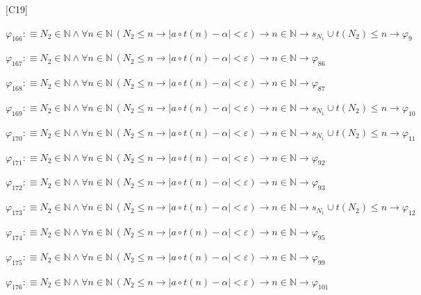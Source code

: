 \begin{fullproof}{[C19]}
\begin{abbrevlist}
\item $\varphi_{166} :\equiv N_{2} \in \mathbb{N} \land \forall n \in \mathbb{N}\,(N_{2} \leq n \to \lvert a \circ t(n) - \alpha \rvert < \varepsilon) \to n \in \mathbb{N} \to s_{N_{1}} \cup t(N_{2}) \leq n \to \varphi_{9}$
\item $\varphi_{167} :\equiv N_{2} \in \mathbb{N} \land \forall n \in \mathbb{N}\,(N_{2} \leq n \to \lvert a \circ t(n) - \alpha \rvert < \varepsilon) \to n \in \mathbb{N} \to \varphi_{86}$
\item $\varphi_{168} :\equiv N_{2} \in \mathbb{N} \land \forall n \in \mathbb{N}\,(N_{2} \leq n \to \lvert a \circ t(n) - \alpha \rvert < \varepsilon) \to n \in \mathbb{N} \to \varphi_{87}$
\item $\varphi_{169} :\equiv N_{2} \in \mathbb{N} \land \forall n \in \mathbb{N}\,(N_{2} \leq n \to \lvert a \circ t(n) - \alpha \rvert < \varepsilon) \to n \in \mathbb{N} \to s_{N_{1}} \cup t(N_{2}) \leq n \to \varphi_{10}$
\item $\varphi_{170} :\equiv N_{2} \in \mathbb{N} \land \forall n \in \mathbb{N}\,(N_{2} \leq n \to \lvert a \circ t(n) - \alpha \rvert < \varepsilon) \to n \in \mathbb{N} \to s_{N_{1}} \cup t(N_{2}) \leq n \to \varphi_{11}$
\item $\varphi_{171} :\equiv N_{2} \in \mathbb{N} \land \forall n \in \mathbb{N}\,(N_{2} \leq n \to \lvert a \circ t(n) - \alpha \rvert < \varepsilon) \to n \in \mathbb{N} \to \varphi_{92}$
\item $\varphi_{172} :\equiv N_{2} \in \mathbb{N} \land \forall n \in \mathbb{N}\,(N_{2} \leq n \to \lvert a \circ t(n) - \alpha \rvert < \varepsilon) \to n \in \mathbb{N} \to \varphi_{93}$
\item $\varphi_{173} :\equiv N_{2} \in \mathbb{N} \land \forall n \in \mathbb{N}\,(N_{2} \leq n \to \lvert a \circ t(n) - \alpha \rvert < \varepsilon) \to n \in \mathbb{N} \to s_{N_{1}} \cup t(N_{2}) \leq n \to \varphi_{12}$
\item $\varphi_{174} :\equiv N_{2} \in \mathbb{N} \land \forall n \in \mathbb{N}\,(N_{2} \leq n \to \lvert a \circ t(n) - \alpha \rvert < \varepsilon) \to n \in \mathbb{N} \to \varphi_{95}$
\item $\varphi_{175} :\equiv N_{2} \in \mathbb{N} \land \forall n \in \mathbb{N}\,(N_{2} \leq n \to \lvert a \circ t(n) - \alpha \rvert < \varepsilon) \to n \in \mathbb{N} \to \varphi_{99}$
\item $\varphi_{176} :\equiv N_{2} \in \mathbb{N} \land \forall n \in \mathbb{N}\,(N_{2} \leq n \to \lvert a \circ t(n) - \alpha \rvert < \varepsilon) \to n \in \mathbb{N} \to \varphi_{101}$

\end{abbrevlist}
\end{fullproof}
